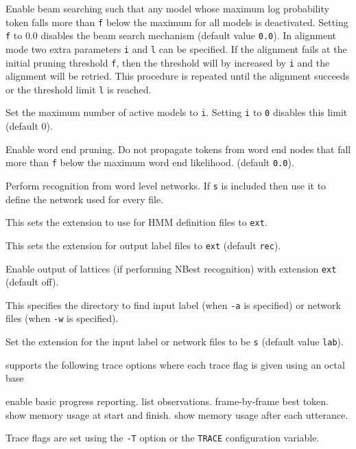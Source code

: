 \begin{optlist}
   Enable beam searching such that any model whose 
        maximum log probability token falls more than \texttt{f} below
        the maximum for all models is deactivated.  Setting \texttt{f}
        to 0.0 disables the beam search mechanism (default value
        \texttt{0.0}). In alignment mode two extra parameters
        \texttt{i} and \texttt{l} can be specified. If the alignment
        fails at the initial pruning threshold \texttt{f}, then the
        threshold will by increased by \texttt{i} and the alignment
        will be retried. This procedure is repeated until the
        alignment succeeds or the threshold limit \texttt{l} is
        reached.        

   Set the maximum number of active models to \texttt{i}.
        Setting \texttt{i} to \texttt{0} disables this limit (default 0).

   Enable word end pruning.  Do not propagate tokens from
        word end nodes that fall more than \texttt{f} below the maximum 
        word end likelihood.  (default \texttt{0.0}).

   Perform recognition from word level networks.  If
        \texttt{s} is included then use it to define the network used
        for every file.

    This sets the extension to use for HMM definition
      files to \texttt{ext}.

    This sets the extension for output label files to
        \texttt{ext} (default \texttt{rec}).

    Enable output of lattices (if performing NBest
        recognition) with extension \texttt{ext} (default off).

   This specifies the directory to find input label (when
        \texttt{-a} is specified) or network files (when \texttt{-w} is
        specified).

   Set the extension for the input label or network files 
        to be \texttt{s}  (default value \texttt{lab}).

\stdoptE
\stdoptG
\stdoptH
\stdoptI
\stdoptJ
\stdoptK
\stdoptP

\end{optlist}


 supports the following trace options where each
trace flag is given using an octal base
\begin{optlist}
    enable basic progress reporting.  
    list observations.
    frame-by-frame best token.
    show memory usage at start and finish.
    show memory usage after each utterance.
\end{optlist}
Trace flags are set using the \texttt{-T} option or the \texttt{TRACE} 
configuration variable.


